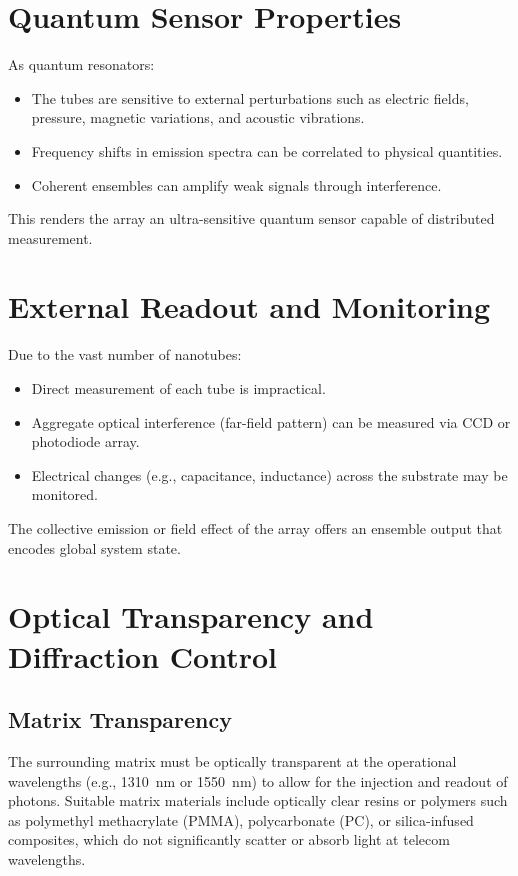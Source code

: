 \documentclass[11pt]{article}
\begin{document}
	\section{Quantum Sensor Properties}
	As quantum resonators:
	\begin{itemize}
		\item The tubes are sensitive to external perturbations such as electric fields, pressure, magnetic variations, and acoustic vibrations.
		\item Frequency shifts in emission spectra can be correlated to physical quantities.
		\item Coherent ensembles can amplify weak signals through interference.
	\end{itemize}
	This renders the array an ultra-sensitive quantum sensor capable of distributed measurement.
	
	\section{External Readout and Monitoring}
	Due to the vast number of nanotubes:
	\begin{itemize}
		\item Direct measurement of each tube is impractical.
		\item Aggregate optical interference (far-field pattern) can be measured via CCD or photodiode array.
		\item Electrical changes (e.g., capacitance, inductance) across the substrate may be monitored.
	\end{itemize}
	The collective emission or field effect of the array offers an ensemble output that encodes global system state.
	
	\section{Optical Transparency and Diffraction Control}
	\subsection{Matrix Transparency}
	The surrounding matrix must be optically transparent at the operational wavelengths (e.g., \SI{1310}{\nano\meter} or \SI{1550}{\nano\meter}) to allow for the injection and readout of photons. Suitable matrix materials include optically clear resins or polymers such as polymethyl methacrylate (PMMA), polycarbonate (PC), or silica-infused composites, which do not significantly scatter or absorb light at telecom wavelengths.
	
\end{document}
